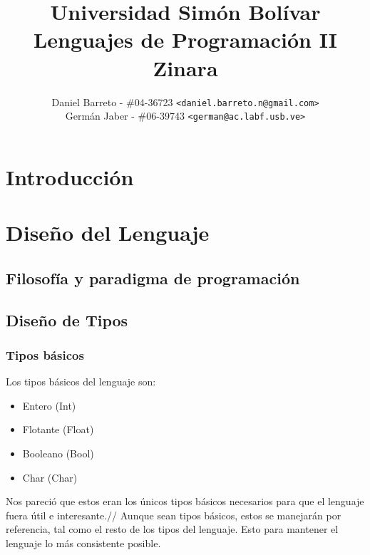 \documentclass[12pt, spanish]{report}
\begin{document}
\title{Universidad Simón Bolívar \\ Lenguajes de Programaci\'on II \\ Zinara}
\author{
  Daniel Barreto - \#04-36723 \texttt{<daniel.barreto.n@gmail.com>} \\
  Germán Jaber - \#06-39743 \texttt{<german@ac.labf.usb.ve>}
}
\maketitle

\tableofcontents

\newpage

\chapter{Introducci\'on}
\label{chap:intr}



\chapter{Dise\~no del Lenguaje}
\label{chap:diseno}


\section{Filosofía y paradigma de programaci\'on}
\label{sec:filpar}


\section{Dise\~no de Tipos}
\label{sec:tipos}

\subsection{Tipos b\'asicos}
\label{sec:tiposbasicos}
Los tipos b\'asicos del lenguaje son:
\begin{itemize}
\item Entero   (Int)
\item Flotante (Float)
\item Booleano (Bool)
\item Char     (Char)
\end{itemize}
Nos pareci\'o que estos eran los \'unicos tipos b\'asicos necesarios
para que el lenguaje fuera \'util e interesante.//
Aunque sean tipos b\'asicos, estos se manejar\'an por referencia,
tal como el resto de los tipos del lenguaje. Esto para mantener
el lenguaje lo m\'as consistente posible.
\end{document}
